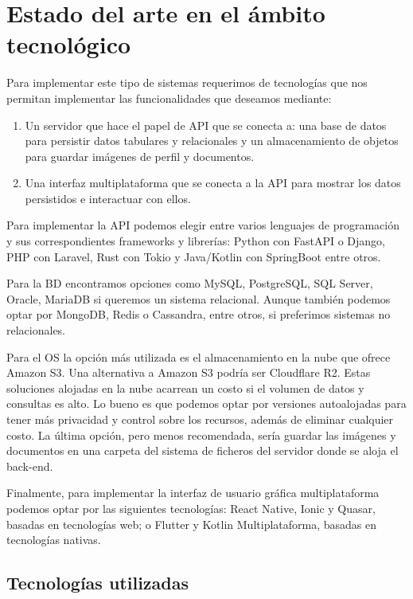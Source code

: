 
\chapter{Estado del arte en el ámbito tecnológico}

Para implementar este tipo de sistemas requerimos de tecnologías que nos permitan implementar las funcionalidades que deseamos mediante: 

\begin{enumerate}
    \item Un servidor que hace el papel de API que se conecta a: una base de datos para persistir datos tabulares y relacionales y un almacenamiento de objetos para guardar imágenes de perfil y documentos.
    \item Una interfaz multiplataforma que se conecta a la API para mostrar los datos persistidos e interactuar con ellos.
\end{enumerate}

Para implementar la API podemos elegir entre varios lenguajes de programación y sus correspondientes frameworks y librerías: Python con FastAPI o Django, PHP con Laravel, Rust con Tokio y Java/Kotlin con SpringBoot entre otros. 

Para la \ac{BD} encontramos opciones como MySQL, PostgreSQL, SQL Server, Oracle, MariaDB si queremos un sistema relacional. Aunque también podemos optar por MongoDB, Redis o Cassandra, entre otros, si preferimos sistemas no relacionales.

Para el \ac{OS} la opción más utilizada es el almacenamiento en la nube que ofrece Amazon S3. Una alternativa a Amazon S3 podría ser Cloudflare R2. Estas soluciones alojadas en la nube acarrean un costo si el volumen de datos y consultas es alto. Lo bueno es que podemos optar por versiones autoalojadas para tener más privacidad y control sobre los recursos, además de eliminar cualquier costo. La última opción, pero menos recomendada, sería guardar las imágenes y documentos en una carpeta del sistema de ficheros del servidor donde se aloja el back-end. 

Finalmente, para implementar la interfaz de usuario gráfica multiplataforma podemos optar por las siguientes tecnologías: React Native, Ionic y Quasar, basadas en tecnologías web; o Flutter y Kotlin Multiplataforma, basadas en tecnologías nativas.


\section{Tecnologías utilizadas}

